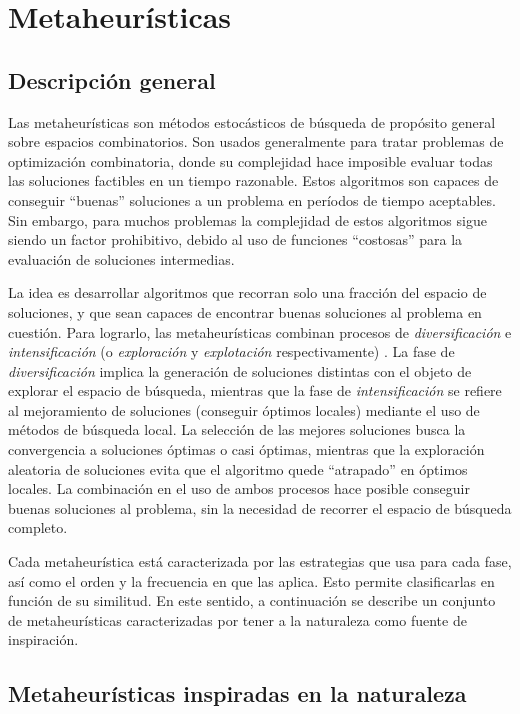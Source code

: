 \chapter{Metaheurísticas}
\label{capitulo2}

\section{Descripción general}

Las metaheurísticas son métodos estocásticos de búsqueda de propósito general sobre espacios combinatorios. Son usados generalmente para tratar problemas de optimización combinatoria, donde su complejidad hace imposible evaluar todas las soluciones factibles en un tiempo razonable. Estos algoritmos son capaces de conseguir ``buenas'' soluciones a un problema en períodos de tiempo aceptables. Sin embargo, para muchos problemas la complejidad de estos algoritmos sigue siendo un factor prohibitivo, debido al uso de funciones ``costosas'' para la evaluación de soluciones intermedias.

La idea es desarrollar algoritmos que recorran solo una fracción del espacio de soluciones, y que sean capaces de encontrar buenas soluciones al problema en cuestión. Para lograrlo, las metaheurísticas combinan procesos de \emph{diversificación} e \emph{intensificación} (o \emph{exploración} y \emph{explotación} respectivamente) \cite{Yang:2008:NMA:1628847}. La fase de \emph{diversificación} implica la generación de soluciones distintas con el objeto de explorar el espacio de búsqueda, mientras que la fase de \emph{intensificación} se refiere al mejoramiento de soluciones (conseguir óptimos locales) mediante el uso de métodos de búsqueda local. La selección de las mejores soluciones busca la convergencia a soluciones óptimas o casi óptimas, mientras que la exploración aleatoria de soluciones evita que el algoritmo quede ``atrapado'' en óptimos locales. La combinación en el uso de ambos procesos hace posible conseguir buenas soluciones al problema, sin la necesidad de recorrer el espacio de búsqueda completo.

Cada metaheurística está caracterizada por las estrategias que usa para cada fase, así como el orden y la frecuencia en que las aplica. Esto permite clasificarlas en función de su similitud. En este sentido, a continuación se describe un conjunto de metaheurísticas caracterizadas por tener a la naturaleza como fuente de inspiración.

\section{Metaheurísticas inspiradas en la naturaleza}

